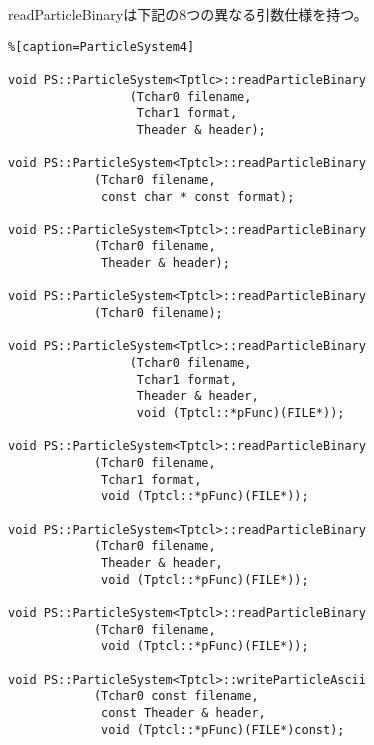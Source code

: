 \label{sec:readParticleBinary}

readParticleBinaryは下記の8つの異なる引数仕様を持つ。
\begin{lstlisting}%[caption=ParticleSystem4]

void PS::ParticleSystem<Tptlc>::readParticleBinary
                 (Tchar0 filename,
                  Tchar1 format,
                  Theader & header);

void PS::ParticleSystem<Tptcl>::readParticleBinary
            (Tchar0 filename,
             const char * const format); 
             
void PS::ParticleSystem<Tptcl>::readParticleBinary
            (Tchar0 filename,
             Theader & header);

void PS::ParticleSystem<Tptcl>::readParticleBinary
            (Tchar0 filename);

void PS::ParticleSystem<Tptlc>::readParticleBinary
                 (Tchar0 filename,
                  Tchar1 format,
                  Theader & header,
                  void (Tptcl::*pFunc)(FILE*));
                 
void PS::ParticleSystem<Tptcl>::readParticleBinary
            (Tchar0 filename,
             Tchar1 format,
             void (Tptcl::*pFunc)(FILE*));

void PS::ParticleSystem<Tptcl>::readParticleBinary
            (Tchar0 filename,
             Theader & header,
             void (Tptcl::*pFunc)(FILE*));
             
void PS::ParticleSystem<Tptcl>::readParticleBinary
            (Tchar0 filename,
             void (Tptcl::*pFunc)(FILE*));

void PS::ParticleSystem<Tptcl>::writeParticleAscii
            (Tchar0 const filename,
             const Theader & header,
             void (Tptcl::*pFunc)(FILE*)const);

\end{lstlisting}

